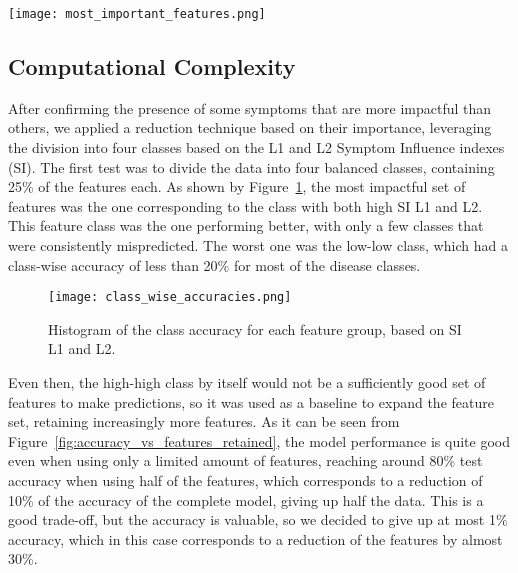 \begin{figure*}[htbp]
	\centering
	\texttt{[image: most\_important\_features.png]}
	\caption{10 most impactful features}\label{fig:most_important_features}
\end{figure*}
\noindent

\subsection{Computational Complexity}
\label{subsec:computational_complexity}
After confirming the presence of some symptoms that are more impactful than others,
we applied a reduction technique based on their importance, leveraging the division
into four classes based on the L1 and L2 Symptom Influence indexes (SI).
The first test was to divide the data into four balanced classes, containing 25\% of the features each.
As shown by Figure~\ref{fig:class_wise_accuracies}, the most impactful set of
features was the one corresponding to the class with both high SI L1 and L2.
This feature class was the one performing better, with only a few classes that were consistently mispredicted.
The worst one was the low-low class, which had a class-wise accuracy of less than 20\% for most of the disease classes.

\begin{figure}[H]
	\centering
	\texttt{[image: class\_wise\_accuracies.png]}
	\caption{Histogram of the class accuracy for each feature group, based on SI L1 and L2.}\label{fig:class_wise_accuracies}
\end{figure}

\noindent
Even then, the high-high class by itself would not be a sufficiently good set of features to make predictions,
so it was used as a baseline to expand the feature set, retaining increasingly more features.
As it can be seen from Figure~\ref{fig:accuracy_vs_features_retained}, the model performance is quite good even when using only
a limited amount of features, reaching around 80\% test accuracy when using half of the features, which corresponds to a
reduction of 10\% of the accuracy of the complete model, giving up half the data.
This is a good trade-off, but the accuracy is valuable, so we decided to give up at most 1\% accuracy,
which in this case corresponds to a reduction of the features by almost 30\%.

